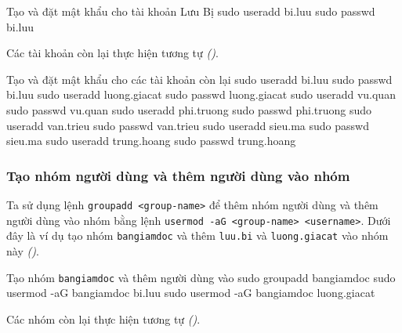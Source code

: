 
\vspace{0.5cm}
\begin{coding}{Tạo và đặt mật khẩu cho tài khoản Lưu Bị}
  sudo useradd bi.luu
  sudo passwd bi.luu
\end{coding}

Các tài khoản còn lại thực hiện tương tự \textit{()}.


\vspace{0.5cm}
\begin{coding}{Tạo và đặt mật khẩu cho các tài khoản còn lại}
  sudo useradd bi.luu
  sudo passwd bi.luu
  sudo useradd luong.giacat
  sudo passwd luong.giacat
  sudo useradd vu.quan
  sudo passwd vu.quan
  sudo useradd phi.truong
  sudo passwd phi.truong
  sudo useradd van.trieu
  sudo passwd van.trieu
  sudo useradd sieu.ma
  sudo passwd sieu.ma
  sudo useradd trung.hoang
  sudo passwd trung.hoang
\end{coding}

\subsubsection{Tạo nhóm người dùng và thêm người dùng vào nhóm}

Ta sử dụng lệnh \texttt{groupadd <group-name>} để thêm nhóm người dùng và thêm người dùng
vào nhóm bằng lệnh \texttt{usermod -aG <group-name> <username>}. Dưới đây là ví dụ tạo
nhóm \texttt{bangiamdoc} và thêm \texttt{luu.bi} và \texttt{luong.giacat} vào
nhóm này \textit{()}.



\vspace{0.5cm}
\begin{coding}{Tạo nhóm \texttt{bangiamdoc} và thêm người dùng vào}
  sudo groupadd bangiamdoc
  sudo usermod -aG bangiamdoc bi.luu
  sudo usermod -aG bangiamdoc luong.giacat
\end{coding}

Các nhóm còn lại thực hiện tương tự \textit{()}.



